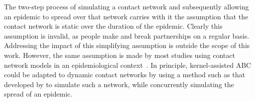 
The two-step process of simulating a contact network and subsequently allowing
an epidemic to spread over that network carries with it the assumption that the
contact network is static over the duration of the epidemic. Clearly this
assumption is invalid, as people make and break partnerships on a regular
basis. Addressing the impact of this simplifying assumption is outside the
scope of this work. However, the same assumption is made by most studies using
contact network models in an epidemiological
context~\autocite{welch2011statistical, bansal2007individual}. In principle,
kernel-assisted \gls{ABC} could be adapted to dynamic contact networks by using
a method such as that developed by \textcite{robinson2012dynamics} to simulate
such a network, while concurrently simulating the spread of an epidemic.

